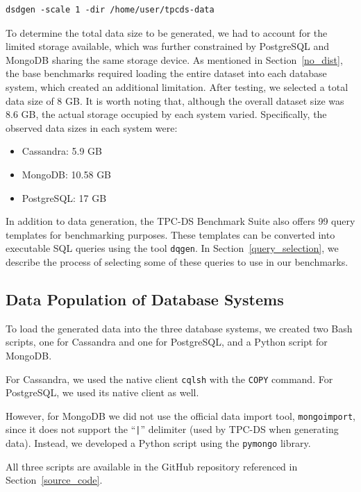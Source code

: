 \documentclass[conference]{IEEEtran}
\begin{document}
\begin{verbatim}
dsdgen -scale 1 -dir /home/user/tpcds-data
\end{verbatim}

To determine the total data size to be generated, we had to account for the limited storage available, which was further constrained by PostgreSQL and MongoDB sharing the same storage device. As mentioned in Section~\ref{no_dist}, the base benchmarks required loading the entire dataset into each database system, which created an additional limitation. After testing, we selected a total data size of 8 GB. It is worth noting that, although the overall dataset size was 8.6 GB, the actual storage occupied by each system varied. Specifically, the observed data sizes in each system were:

\begin{itemize}
    \item Cassandra: 5.9 GB
    \item MongoDB: 10.58 GB
    \item PostgreSQL: 17 GB
\end{itemize}


In addition to data generation, the TPC-DS Benchmark Suite also offers 99 query templates for benchmarking purposes. These templates can be converted into executable SQL queries using the tool \texttt{dqgen}. In Section~\ref{query_selection}, we describe the process of selecting some of these queries to use in our benchmarks.


\subsection{Data Population of Database Systems}

To load the generated data into the three database systems, we created two Bash scripts,
one for Cassandra and one for PostgreSQL, and a Python script for MongoDB.

For Cassandra, we used the native client \texttt{cqlsh} with the \texttt{COPY} command.
For PostgreSQL, we used its native client as well.

However, for MongoDB we did not use the official data import tool, \texttt{mongoimport},
since it does not support the ``\texttt{|}'' delimiter (used by TPC-DS when generating data).
Instead, we developed a Python script using the \texttt{pymongo} library.

All three scripts are available in the GitHub repository referenced in Section~\ref{source_code}.
\end{document}
